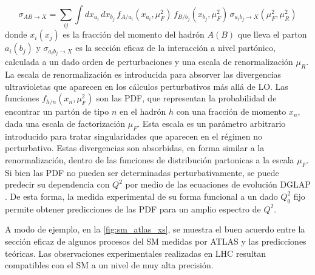 \begin{equation}
  \sigma_{AB\to X} = \sum_{ij} \int dx_{a_i} \, dx_{b_j} \, f_{A/a_i} (x_{a_i}, \mu_F^2) \, f_{B/b_j} (x_{b_j}, \mu_F^2) \, \sigma_{a_i b_j\to X}(\mu_F^2,\mu_R^2)
\end{equation}
%
donde $x_i(x_j)$ es la fracción del momento del hadrón $A(B)$ que lleva el
parton $a_i(b_j)$ y $\sigma_{a_i b_j\to X}$ es la sección eficaz de la
interacción a nivel partónico, calculada a un dado orden de perturbaciones y una
escala de renormalización $\mu_R$. La escala de renormalización es introducida
para absorver las divergencias ultravioletas que aparecen en los cálculos
perturbativos más allá de LO. Las funciones $f_{h/n}(x_n,\mu_F^2)$ son las PDF,
que representan la probabilidad de encontrar un partón de tipo $n$ en el hadrón
$h$ con una fracción de momento $x_n$, dada una escala de factorización $\mu_F$.
Esta escala es un parámetro arbitrario introducido para tratar singularidades
que aparecen en el régimen no perturbativo. Estas divergencias son absorbidas,
en forma similar a la renormalización, dentro de las funciones de distribución
partonicas a la escala $\mu_F$. Si bien las PDF no pueden ser determinadas
perturbativamente, se puede predecir su dependencia con $Q^2$ por medio de las
ecuaciones de evolución DGLAP \cite{Gribov:1972ri,Lipatov:1974qm,ALTARELLI1977298}.
De esta forma, la medida experimental de su
forma funcional a un dado $Q_0^2$ fijo permite obtener predicciones de las PDF
para un amplio espectro de $Q^2$.


A modo de ejemplo, en la \cref{fig:sm_atlas_xs}, se muestra el buen acuerdo
entre la sección eficaz de algunos procesos del SM medidas por ATLAS y las
predicciones teóricas. Las observaciones experimentales realizadas en LHC
resultan compatibles con el SM a un nivel de muy alta precisión.

